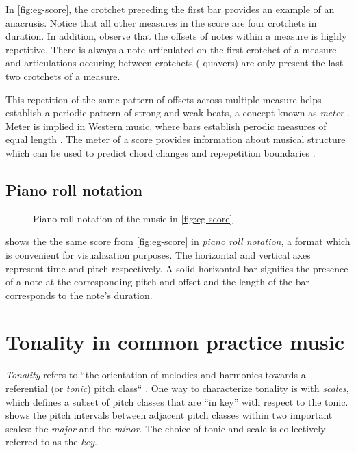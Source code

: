 In \vref{fig:eg-score}, the crotchet preceding the first bar provides an
example of an anacrusis. Notice that all other measures in the score are four
crotchets in duration. In addition, observe that the offsets of notes within a
measure is highly repetitive. There is always a note articulated on the first
crotchet of a measure and articulations occuring between crotchets (\ie
quavers) are only present the last two crotchets of a measure.

This repetition of the same pattern of offsets across multiple measure helps
establish a periodic pattern of strong and weak beats, a concept known as
\emph{meter} \citep{grove-meter}. Meter is implied in Western music, where bars
establish perodic measures of equal length \citep{handel1993listening}. The
meter of a score provides information about musical structure which can be used
to predict chord changes and repepetition boundaries
\citep{cooper1963rhythmic}.

\subsection{Piano roll notation}

\begin{figure}[tb]
    \centering
    
    \caption{Piano roll notation of the music in \cref{fig:eg-score}}
    \label{fig:eg-piano-roll}
\end{figure}

 shows the the same score from
\vref{fig:eg-score} in \emph{piano roll notation}, a format which is convenient
for visualization purposes. The horizontal and vertical axes represent time and
pitch respectively. A solid horizontal bar signifies the presence of a note at
the corresponding pitch and offset and the length of the bar corresponds to the
note's duration.

\section{Tonality in common practice music}

\emph{Tonality} refers to ``the orientation of melodies and harmonies towards a
referential (or \emph{tonic}) pitch class`` \citep{grove-tonality}. One way to
characterize tonality is with \emph{scales}, which defines a subset of pitch
classes that are ``in key'' with respect to the tonic. 
shows the pitch intervals between adjacent pitch classes within two important
scales: the \emph{major} and the \emph{minor}. The choice of tonic and scale is
collectively referred to as the \emph{key}.

